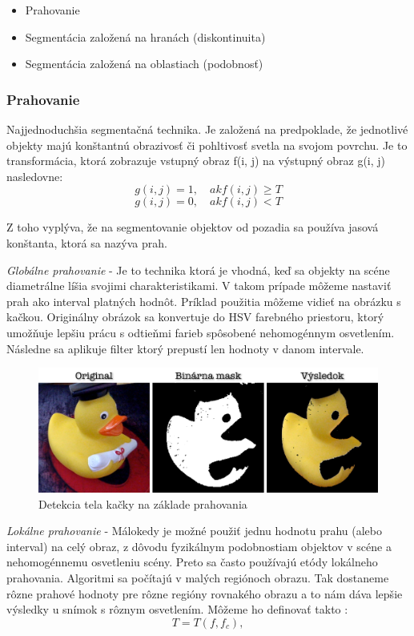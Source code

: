 \begin{itemize}
\item Prahovanie
\item Segmentácia založená na hranách (diskontinuita)
\item Segmentácia založená na oblastiach (podobnosť)
\end{itemize}

\subsubsection{Prahovanie}
Najjednoduchšia segmentačná technika. Je založená na predpoklade, že jednotlivé objekty majú konštantnú obrazivosť či pohltivosť svetla na svojom povrchu. Je to transformácia, ktorá zobrazuje vstupný obraz f(i, j) na výstupný obraz g(i, j) nasledovne: 
$$g (i{,}j)=1 {,}\quad {ak} f(i{,}j)\ge T$$
$$g (i{,}j)=0 {,}\quad {ak} f(i{,}j)  < T$$


Z toho vyplýva, že na segmentovanie objektov od pozadia sa používa jasová konštanta, ktorá sa nazýva prah. 


\textit{Globálne prahovanie} - Je to technika ktorá je vhodná, keď sa objekty na scéne diametrálne líšia svojimi charakteristikami. V takom prípade môžeme nastaviť prah ako interval platných hodnôt. Príklad použitia môžeme vidieť na obrázku s kačkou. Originálny obrázok sa konvertuje do HSV farebného priestoru, ktorý umožňuje lepšiu prácu s odtieňmi farieb spôsobené nehomogénnym osvetlením. Následne sa aplikuje filter ktorý prepustí len hodnoty v danom intervale.

\begin{figure}[H]
\begin{center}
	\includegraphics[scale=0.25]{obrazky/prahovanie}
	\caption{Detekcia tela kačky na základe prahovania}
	\end{center}
\end{figure}


\textit{Lokálne prahovanie} - Málokedy je možné použiť jednu hodnotu prahu (alebo interval) na celý obraz, z dôvodu fyzikálnym podobnostiam objektov v scéne a  nehomogénnemu osvetleniu scény. Preto sa často používajú etódy lokálneho prahovania. Algoritmi sa počítajú v malých regiónoch obrazu. Tak dostaneme rôzne prahové hodnoty pre rôzne regióny rovnakého obrazu a to nám dáva lepšie výsledky u snímok s rôznym osvetlením. Môžeme ho definovať takto : 
$$T=T(f {,} f_c){,}$$

